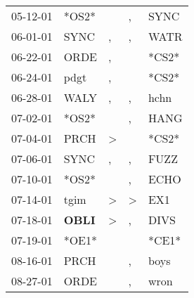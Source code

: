 \begin{supertabular}{p{0.07\textwidth}p{0.06\textwidth}p{0.02\textwidth}p{0.02\textwidth}p{0.06\textwidth}}
          05-12-01\textsuperscript{} &                            *OS2* &                  &                , &           SYNC\textsuperscript{} \\
          06-01-01\textsuperscript{} &           SYNC\textsuperscript{} &                , &                , &           WATR\textsuperscript{} \\
          06-22-01\textsuperscript{} &           ORDE\textsuperscript{} &                , &                  &                            *CS2* \\
          06-24-01\textsuperscript{} &           pdgt\textsuperscript{} &                , &                  &                            *CS2* \\
          06-28-01\textsuperscript{} &           WALY\textsuperscript{} &                , &                , &           hchn\textsuperscript{} \\
          07-02-01\textsuperscript{} &                            *OS2* &                  &                , &           HANG\textsuperscript{} \\
          07-04-01\textsuperscript{} &           PRCH\textsuperscript{} &     \textgreater &                  &                            *CS2* \\
          07-06-01\textsuperscript{} &           SYNC\textsuperscript{} &                , &                , &           FUZZ\textsuperscript{} \\
          07-10-01\textsuperscript{} &                            *OS2* &                  &                , &           ECHO\textsuperscript{} \\
          07-14-01\textsuperscript{} &           tgim\textsuperscript{} &     \textgreater &     \textgreater &            EX1\textsuperscript{} \\
          07-18-01\textsuperscript{} &  \textbf{OBLI\textsuperscript{}} &     \textgreater &                , &           DIVS\textsuperscript{} \\
          07-19-01\textsuperscript{} &                            *OE1* &                  &                  &                            *CE1* \\
          08-16-01\textsuperscript{} &           PRCH\textsuperscript{} &                  &                , &           boys\textsuperscript{} \\
          08-27-01\textsuperscript{} &           ORDE\textsuperscript{} &                  &                , &           wron\textsuperscript{} \\

\end{supertabular}
